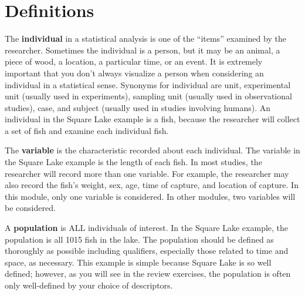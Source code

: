 \documentclass[10pt,openany]{book}\usepackage[]{graphicx}\usepackage[]{color}
\begin{document}
\vspace{-24pt}
\section{Definitions} \label{sect:IVPPSS}
\vspace{-12pt}
The \textbf{individual} in a statistical analysis is one of the ``items'' examined by the researcher.  Sometimes the individual is a person, but it may be an animal, a piece of wood, a location, a particular time, or an event. It is extremely important that you don't always visualize a person when considering an individual in a statistical sense. Synonyms for individual are unit, experimental unit (usually used in experiments), sampling unit (usually used in observational studies), case, and subject (usually used in studies involving humans). An individual in the Square Lake example is a fish, because the researcher will collect a set of fish and examine each individual fish.

The \textbf{variable} is the characteristic recorded about each individual. The variable in the Square Lake example is the length of each fish. In most studies, the researcher will record more than one variable. For example, the researcher may also record the fish's weight, sex, age, time of capture, and location of capture. In this module, only one variable is considered. In other modules, two variables will be considered.

A \textbf{population} is ALL individuals of interest. In the Square Lake example, the population is all 1015 fish in the lake. The population should be defined as thoroughly as possible including qualifiers, especially those related to time and space, as necessary. This example is simple because Square Lake is so well defined; however, as you will see in the review exercises, the population is often only well-defined by your choice of descriptors.
\end{document}
